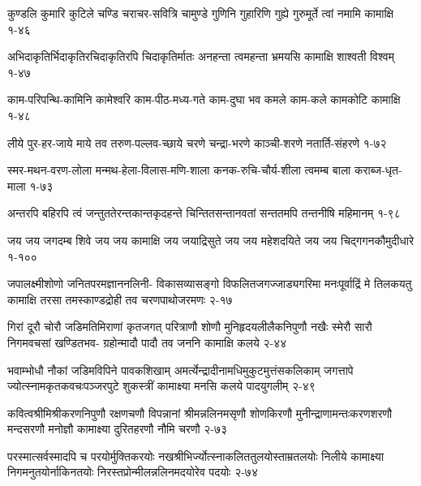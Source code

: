 \setlength{\shlokaspaceskip}{10pt}

\annotwolineshloka
{कुण्डलि कुमारि कुटिले चण्डि चराचर-सवित्रि चामुण्डे}
{गुणिनि गुहारिणि गुह्ये गुरुमूर्ते त्वां नमामि कामाक्षि}
{१-४६}

\annotwolineshloka
{अभिदाकृतिर्भिदाकृतिरचिदाकृतिरपि चिदाकृतिर्मातः}
{अनहन्ता त्वमहन्ता भ्रमयसि कामाक्षि शाश्वती विश्वम्}
{१-४७}

\annotwolineshloka
{काम-परिपन्थि-कामिनि कामेश्वरि काम-पीठ-मध्य-गते}
{काम-दुघा भव कमले काम-कले कामकोटि कामाक्षि}
{१-४८}

\annotwolineshloka
{लीये पुर-हर-जाये माये तव तरुण-पल्लव-च्छाये}
{चरणे चन्द्रा-भरणे काञ्ची-शरणे नतार्ति-संहरणे}
{१-७२}


\annotwolineshloka
{स्मर-मथन-वरण-लोला मन्मथ-हेला-विलास-मणि-शाला}
{कनक-रुचि-चौर्य-शीला त्वमम्ब बाला कराब्ज-धृत-माला}
{१-७३}

\annotwolineshloka
{अन्तरपि बहिरपि त्वं जन्तुततेरन्तकान्तकृदहन्ते}
{चिन्तितसन्तानवतां सन्ततमपि तन्तनीषि महिमानम्}
{१-९८}

\annofourlineindentedshloka
{जय जय जगदम्ब शिवे}
{जय जय कामाक्षि जय जयाद्रिसुते}
{जय जय महेशदयिते}
{जय जय चिद्गगनकौमुदीधारे}
{१-१००}





\annofourlineindentedshloka
{जपालक्ष्मीशोणो जनितपरमज्ञाननलिनी-}
{विकासव्यासङ्गो विफलितजगज्जाड्यगरिमा}
{मनःपूर्वाद्रिं मे तिलकयतु कामाक्षि तरसा}
{तमस्काण्डद्रोही तव चरणपाथोजरमणः}
{२-१७}

\annofourlineindentedshloka
{गिरां दूरौ चोरौ जडिमतिमिराणां कृतजगत्}
{परित्राणौ शोणौ मुनिहृदयलीलैकनिपुणौ}
{नखैः स्मेरौ सारौ निगमवचसां खण्डितभव-}
{ग्रहोन्मादौ पादौ तव जननि कामाक्षि कलये}
{२-४४}

\annofourlineindentedshloka
{भवाम्भोधौ नौकां जडिमविपिने पावकशिखाम्}
{अमर्त्येन्द्रादीनामधिमुकुटमुत्तंसकलिकाम्}
{जगत्तापे ज्योत्स्नामकृतकवचःपञ्जरपुटे}
{शुकस्त्रीं कामाक्ष्या मनसि कलये पादयुगलीम्}
{२-४९}

\annofourlineindentedshloka
{कवित्वश्रीमिश्रीकरणनिपुणौ रक्षणचणौ}
{विपन्नानां श्रीमन्नलिनमसृणौ शोणकिरणौ}
{मुनीन्द्राणामन्तःकरणशरणौ मन्दसरणौ}
{मनोज्ञौ कामाक्ष्या दुरितहरणौ नौमि चरणौ}
{२-७३}

\annofourlineindentedshloka
{परस्मात्सर्वस्मादपि च परयोर्मुक्तिकरयोः}
{नखश्रीभिर्ज्योत्स्नाकलिततुलयोस्ताम्रतलयोः}
{निलीये कामाक्ष्या निगमनुतयोर्नाकिनतयोः}
{निरस्तप्रोन्मीलन्नलिनमदयोरेव पदयोः}
{२-७४}

